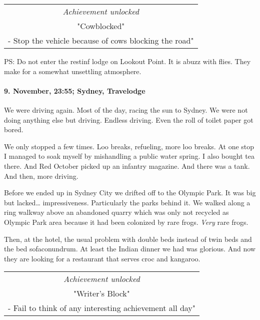 \begin{center}
\begin{tabular}{||c||}
\emph{Achievement unlocked}\\
"Cowblocked"\\
\multicolumn{1}{||p{0.8\textwidth}||}{\footnotesize - Stop the vehicle because of cows blocking the road"} \\
\end{tabular}
\end{center}

PS: Do not enter the restinf lodge on Lookout Point.
It is abuzz with flies.
They make for a somewhat unsettling atmosphere.

\paragraph{9. November, 23:55; Sydney, Travelodge}
We were driving again.
Most of the day, racing the sun to Sydney.
We were not doing anything else but driving.
Endless driving.
Even the roll of toilet paper got bored.

We only stopped a few times.
Loo breaks, refueling, more loo breaks.
At one stop I managed to soak myself by mishandling a public water spring.
I also bought tea there.
And Red October picked up an infantry magazine.
And there was a tank.
And then, more driving.

Before we ended up in Sydney City we drifted off to the Olympic Park.
It was big but lacked\ldots{} impressiveness.
Particularly the parks behind it.
We walked along a ring walkway above an abandoned quarry which was only not recycled as Olympic Park area because it had been colonized by rare frogs.
\emph{Very} rare frogs.

Then, at the hotel, the usual problem with double beds instead of twin beds and the bed sofaconundrum.
At least the Indian dinner we had was glorious.
And now they are looking for a restaurant that serves croc and kangaroo.

\begin{center}
\begin{tabular}{||c||}
\emph{Achievement unlocked}\\
"Writer's Block"\\
\multicolumn{1}{||p{0.8\textwidth}||}{\footnotesize - Fail to think of any interesting achievement all day"} \\
\end{tabular}
\end{center}



